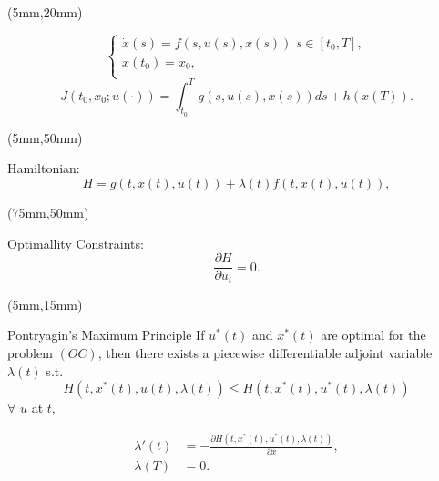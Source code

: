 \begin{frame}
\begin{textblock*}{120mm}(5mm,20mm)
	\begin{yellowbox}{}
		$$\left\{ \begin{array}{l}
		\dot{x}(s)=f(s,u(s),x(s))\,\,s\in [t_0,T], \\
		x(t_0)=x_0,\\
		\end{array}
		\right.$$			
		$$J(t_0,x_0;u(\cdot))=\int_{t_0}^{T}g(s,u(s),x(s))ds+h(x(T)).$$
	\end{yellowbox}
\end{textblock*}

	\begin{textblock*}{68mm}(5mm,50mm)
		\begin{greenbox}{Hamiltonian:}
			\begin{equation*}
			H=g(t,x(t),u(t))+\lambda(t)f(t,x(t),u(t)),
			\end{equation*}
		\end{greenbox}
	\end{textblock*}

	\begin{textblock*}{50mm}(75mm,50mm)
		\begin{yellowbox}{Optimallity Constraints:}
			\begin{equation*}
			\frac{\partial H}{\partial u_i}=0.
			\end{equation*}
		\end{yellowbox}
	\end{textblock*}
	
\end{frame}
\begin{frame}
	\begin{textblock*}{120mm}(5mm,15mm)
		\begin{graybox}{Pontryagin’s Maximum Principle}
			If $u^*(t)$ and $x^*(t)$ are optimal for the problem $(OC)$, then there exists a piecewise differentiable adjoint variable $\lambda(t)$ s.t.
				\begin{equation*}
					H(t,x^*(t),u(t),\lambda(t))\leq H(t,x^*(t),u^*(t),\lambda(t))
				\end{equation*}
			$\forall$ $u$ at $t$,

				\begin{align*}
					\lambda'(t) &= -\frac{\partial H(t,x^*(t),u^*(t),\lambda(t))}{\partial x},\\
					\lambda(T) &= 0.
				\end{align*}
		\end{graybox}
		
	\end{textblock*}
	
\end{frame}


